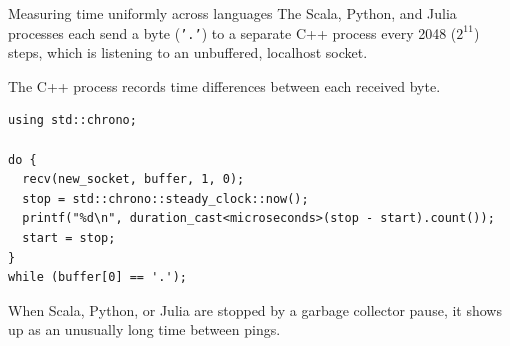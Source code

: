 \documentclass[aspectratio=169]{beamer}
\begin{document}
\begin{frame}[fragile]{Measuring time uniformly across languages}
\vspace{0.3 cm}
The Scala, Python, and Julia processes each send a byte (\texttt{'.'}) to a separate C++ process every 2048 ($2^{11}$) steps, which is listening to an unbuffered, localhost socket.

\vspace{0.2 cm}
The C++ process records time differences between each received byte.

\small
\vspace{0.3 cm}
\begin{verbatim}
using std::chrono;

do {
  recv(new_socket, buffer, 1, 0);
  stop = std::chrono::steady_clock::now();
  printf("%d\n", duration_cast<microseconds>(stop - start).count());
  start = stop;
}
while (buffer[0] == '.');
\end{verbatim}

\normalsize
\vspace{0.3 cm}
When Scala, Python, or Julia are stopped by a garbage collector pause, it shows up as an unusually long time between pings.
\end{frame}
\end{document}
